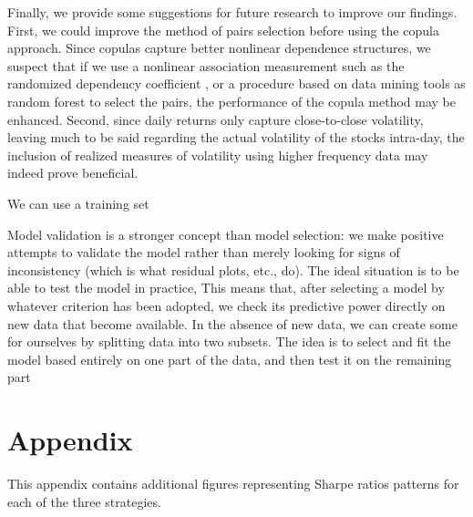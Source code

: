 \documentclass[a4paper]{article}
\begin{document}
	Finally, we provide some suggestions for future research to improve our findings. First, we could improve the method of pairs selection before using the copula approach. Since copulas capture better nonlinear dependence structures, we suspect that if we use a nonlinear association measurement such as the randomized dependency coefficient \citep{lopez2013randomized}, or a procedure based on data mining tools as random forest \citep{dlrz10} to select the pairs, the performance of the copula method may be enhanced. Second, since daily returns only capture close-to-close volatility, leaving much to be said regarding the actual volatility of the stocks intra-day, the inclusion of realized measures of volatility using higher frequency data may indeed prove beneficial.
	
	We can use a training set
	
	Model validation is a stronger concept than model selection: we make positive attempts to validate the model rather than merely looking for signs of inconsistency (which is what residual plots, etc., do). The ideal situation is to be able to test the model in practice, This means that, after selecting a model by whatever criterion has been adopted, we check its predictive power directly on new data that become available. In the absence of new data, we can create some for ourselves by splitting data into two subsets. The idea is to select and fit the model based entirely on one part of the data, and then test it on the remaining part
	
	
	
	
	\newpage
	
	\section*{Appendix}
	\vspace{0.6cm}
	
	
	This appendix contains additional figures representing Sharpe ratios patterns for each of the three strategies.
	
%	
	
\end{document}
